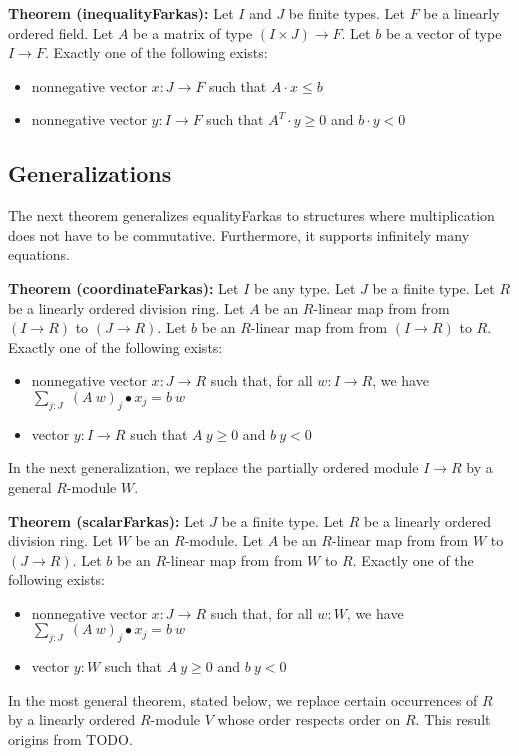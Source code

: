 \documentclass[]{article}
\renewcommand{\.}{\hskip .75pt}
\let\r=\rightarrow
\let\*=\cdot
\begin{document}
\medskip \noindent
\textbf{Theorem (inequalityFarkas):}
Let $I$ and $J$ be finite types.
Let $F$ be a linearly ordered field.
Let $A$ be a matrix of type $(I \times J) \r F$.
Let $b$ be a vector of type $I \r F$.
Exactly one of the following exists:
\begin{itemize}
\item nonnegative vector $x : J \r F$ such that $A \* x \le b$
\item nonnegative vector $y : I \r F$ such that $A^T\! \* y \ge 0$ and $b \* y < 0$
\end{itemize}


\subsection{Generalizations}

The next theorem generalizes equalityFarkas to structures where
multiplication does not have to be commutative.
Furthermore, it supports infinitely many equations.

\medskip \noindent
\textbf{Theorem (coordinateFarkas):}
Let $I$ be any type.
Let $J$ be a finite type.
Let $R$ be a linearly ordered division ring.
Let $A$ be an $R$-linear map from from $(I \r R)$ to $(J \r R)$.
Let $b$ be an $R$-linear map from from $(I \r R)$ to $R$.
Exactly one of the following exists:
\begin{itemize}
\item nonnegative vector $x : J \r R$ such that, for all $w : I \r R$, we have
$ \sum_{j : J}\; (A~w)_j \bullet x_j = b~w $
\item vector $y : I \r R$ such that $A~y \ge 0$ and $b~y < 0$
\end{itemize}
In the next generalization, we replace the partially ordered module $I \r R$ by
a general $R$-module $W$.

\medskip \noindent
\textbf{Theorem (scalarFarkas):}
Let $J$ be a finite type.
Let $R$ be a linearly ordered division ring.
Let $W$ be an $R$-module.
Let $A$ be an $R$-linear map from from $W$ to $(J \r R)$.
Let $b$ be an $R$-linear map from from $W$ to $R$.
Exactly one of the following exists:
\begin{itemize}
\item nonnegative vector $x : J \r R$ such that, for all $w : W$, we have
$ \sum_{j : J}\; (A~w)_j \bullet x_j = b~w $
\item vector $y : W$ such that $A~y \ge 0$ and $b~y < 0$
\end{itemize}
In the most general theorem, stated below, we replace certain occurrences of $R$ by
a linearly ordered $R$-module $V$ whose order respects order on $R$.
This result origins from TODO.
\end{document}
